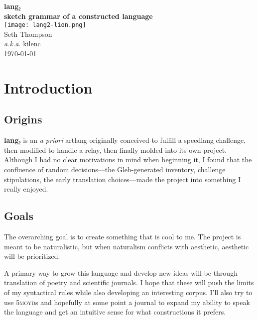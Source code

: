 \documentclass[fontsize=12pt,twoside=false,numbers=noenddot]{class/kaobook}
\title[\langname{} Grammar]{\langname{}}
\subtitle{a grammar of a constructed language}
\author{kilenc}
\date{\today}
\newcommand{\langname}{\textbf{lang₂}}
\newcommand{\tsc}[1]{\textsc{#1}}
\renewcommand{\bf}{\bfseries}
\begin{document}
\frontmatter

\begin{titlepage} \centering
	\hspace{0pt} \vfill
	{\huge \langname{} } \\\medbreak 
	{\large \bf sketch grammar of a constructed language} \\\bigbreak
	\texttt{[image: lang2-lion.png]} \\\bigbreak
	{\large Seth Thompson \\ \small \emph{a.k.a.} kilenc} \\\bigbreak
	{\small \today}
	\vfill \hspace{0pt}
\end{titlepage}

\setlength{\textheight}{23cm} %
\etocstandarddisplaystyle %
\etocstandardlines %
\tableofcontents 


\setchapterpreamble[u]{\margintoc}
\chapter{Introduction}
\section{Origins}
\langname{} is an \emph{a priori} artlang originally conceived to fulfill a speedlang challenge, then modified to handle a relay, then finally molded into its own project. Although I had no clear motivations in mind when beginning it, I found that the confluence of random decisions---the Gleb-generated inventory, challenge stipulations, the early translation choices---made the project into something I really enjoyed.

\section{Goals}
The overarching goal is to create something that is cool to me. The project is meant to be naturalistic, but when naturalism conflicts with aesthetic, aesthetic will be prioritized.

A primary way to grow this language and develop new ideas will be through translation of poetry and scientific journals. I hope that these will push the limits of my syntactical rules while also developing an interesting corpus. I'll also try to use \tsc{5moyd}s and hopefully at some point a journal to expand my ability to speak the language and get an intuitive sense for what constructions it prefers.
\end{document}
